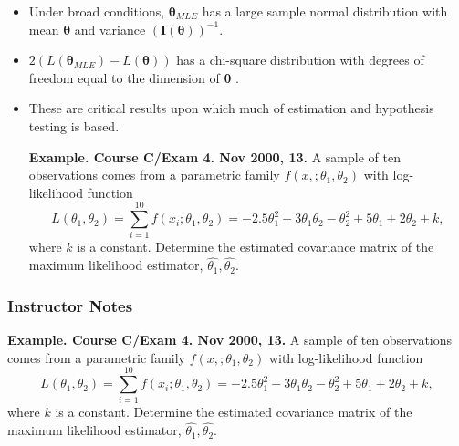 \documentclass[]{book}
\begin{document}
\begin{itemize}
\item
  Under broad conditions, \(\boldsymbol \theta_{MLE}\) has a large
  sample normal distribution with mean \(\boldsymbol \theta\) and
  variance \(\left( \mathbf{I}(\boldsymbol \theta) \right)^{-1}\).
\item
  \(2 \left( L(\boldsymbol \theta_{MLE}) - L(\boldsymbol \theta) \right)\)
  has a chi-square distribution with degrees of freedom equal to the
  dimension of \(\boldsymbol \theta\) .
\item
  These are critical results upon which much of estimation and
  hypothesis testing is based.

  \textbf{Example. Course C/Exam 4. Nov 2000, 13.} A sample of ten
  observations comes from a parametric family
  \(f(x,; \theta_1, \theta_2)\) with log-likelihood function
  \[L(\theta_1, \theta_2)= \sum_{i=1}^{10} f(x_i; \theta_1, \theta_2) = -2.5 \theta_1^2 - 3
  \theta_1 \theta_2 - \theta_2^2 + 5 \theta_1 + 2 \theta_2 + k,\] where
  \(k\) is a constant. Determine the estimated covariance matrix of the
  maximum likelihood estimator, \(\hat{\theta_1}, \hat{\theta_2}\).
\end{itemize}

\subsubsection{Instructor Notes}\label{instructor-notes-1}

\textbf{Example. Course C/Exam 4. Nov 2000, 13.} A sample of ten
observations comes from a parametric family
\(f(x,; \theta_1, \theta_2)\) with log-likelihood function
\[L(\theta_1, \theta_2)= \sum_{i=1}^{10} f(x_i; \theta_1, \theta_2) = -2.5 \theta_1^2 - 3
\theta_1 \theta_2 - \theta_2^2 + 5 \theta_1 + 2 \theta_2 + k,\] where
\(k\) is a constant. Determine the estimated covariance matrix of the
maximum likelihood estimator, \(\hat{\theta_1}, \hat{\theta_2}\).
\end{document}
